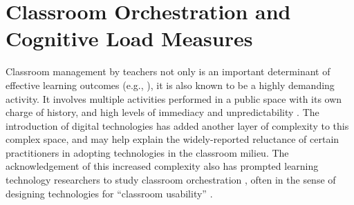 \documentclass[10pt,journal,compsoc]{IEEEtran}
\begin{document}
%




\section{Classroom Orchestration and Cognitive Load Measures}\label{sec:related}

Classroom management by teachers not only is an important determinant of effective learning outcomes (e.g., \cite{Gomez2013,Onrubia2012}), it is also known to be a highly demanding activity. It involves multiple activities performed in a public space with its own charge of history, and high levels of immediacy and unpredictability \cite{Doyle2006}. The introduction of digital technologies has added another layer of complexity to this complex space, and may help explain the widely-reported reluctance of certain practitioners in adopting technologies in the classroom milieu. The acknowledgement of this increased complexity also has prompted learning technology researchers to study classroom orchestration \cite{Dillenbourg2009, Prieto2011}, often in the sense of designing technologies for ``classroom usability'' \cite{Dillenbourg2011}.
\end{document}
